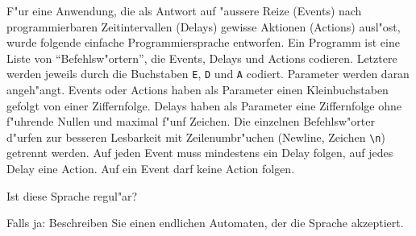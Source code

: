 F"ur eine Anwendung, die als Antwort auf "aussere Reize (Events)
nach programmierbaren Zeitintervallen (Delays) gewisse Aktionen (Actions)
ausl"ost, wurde folgende einfache Programmiersprache entworfen. Ein
Programm ist eine Liste von ``Befehlsw"ortern'', die Events, Delays und Actions
codieren. Letztere werden
jeweils durch die Buchstaben {\tt E}, {\tt D} und {\tt A} codiert.
Parameter werden daran angeh"angt. Events oder Actions haben als Parameter
einen Kleinbuchstaben gefolgt von einer Ziffernfolge. Delays haben als
Parameter eine Ziffernfolge ohne f"uhrende Nullen und maximal f"unf
Zeichen. Die einzelnen Befehlsw"orter d"urfen zur besseren Lesbarkeit mit Zeilenumbr"uchen
(Newline, Zeichen \verb+\n+) getrennt werden. Auf jeden Event muss mindestens
ein Delay folgen, auf jedes Delay eine Action. Auf ein Event darf keine Action folgen.
\begin{teilaufgaben}
\item Ist diese Sprache regul"ar?
\item Falls ja: Beschreiben Sie einen endlichen Automaten, der die
Sprache akzeptiert.
\end{teilaufgaben}

